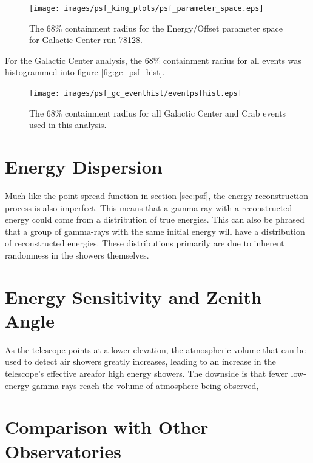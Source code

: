 \begin{figure}[ht]
  \begin{center}
    \texttt{[image: images/psf\_king\_plots/psf\_parameter\_space.eps]}
    \caption[PSF Parameter Space]{The 68\% containment radius for the Energy/Offset parameter space for Galactic Center run 78128.}\label{fig:psf_paramspace}
  \end{center}
\end{figure}

For the Galactic Center analysis, the 68\% containment radius for all events was histogrammed into figure \ref{fig:gc_psf_hist}.

\begin{figure}[ht]
  \begin{center}
    \texttt{[image: images/psf\_gc\_eventhist/eventpsfhist.eps]}
    \caption[Crab and Galactic Center Event PSFs]{The 68\% containment radius for all Galactic Center and Crab events used in this analysis.}\label{fig:psf_paramspace}
  \end{center}
\end{figure}


\section{Energy Dispersion}
Much like the point spread function in section \ref{sec:psf}, the energy reconstruction process is also imperfect.
This means that a gamma ray with a reconstructed energy could come from a distribution of true energies.
This can also be phrased that a group of gamma-rays with the same initial energy will have a distribution of reconstructed energies.
These distributions primarily are due to inherent randomness in the showers themselves.


\section{Energy Sensitivity and Zenith Angle}

As the telescope points at a lower elevation, the atmospheric volume that can be used to detect air showers greatly increases, leading to an increase in the telescope's effective areafor high energy showers.
The downside is that fewer low-energy gamma rays reach the volume of atmosphere being observed, 


\section{Comparison with Other Observatories}

